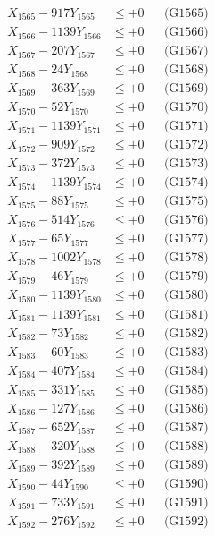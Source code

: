 \documentclass[a4paper,10pt]{article}
\begin{document}
{\begin{align}
X_{1565} - 917Y_{1565} &\leq +0 && \text{(G1565)} \\
X_{1566} - 1139Y_{1566} &\leq +0 && \text{(G1566)} \\
X_{1567} - 207Y_{1567} &\leq +0 && \text{(G1567)} \\
X_{1568} - 24Y_{1568} &\leq +0 && \text{(G1568)} \\
X_{1569} - 363Y_{1569} &\leq +0 && \text{(G1569)} \\
X_{1570} - 52Y_{1570} &\leq +0 && \text{(G1570)} \\
\allowbreak
X_{1571} - 1139Y_{1571} &\leq +0 && \text{(G1571)} \\
X_{1572} - 909Y_{1572} &\leq +0 && \text{(G1572)} \\
X_{1573} - 372Y_{1573} &\leq +0 && \text{(G1573)} \\
X_{1574} - 1139Y_{1574} &\leq +0 && \text{(G1574)} \\
X_{1575} - 88Y_{1575} &\leq +0 && \text{(G1575)} \\
X_{1576} - 514Y_{1576} &\leq +0 && \text{(G1576)} \\
X_{1577} - 65Y_{1577} &\leq +0 && \text{(G1577)} \\
X_{1578} - 1002Y_{1578} &\leq +0 && \text{(G1578)} \\
X_{1579} - 46Y_{1579} &\leq +0 && \text{(G1579)} \\
X_{1580} - 1139Y_{1580} &\leq +0 && \text{(G1580)} \\
\allowbreak
X_{1581} - 1139Y_{1581} &\leq +0 && \text{(G1581)} \\
X_{1582} - 73Y_{1582} &\leq +0 && \text{(G1582)} \\
X_{1583} - 60Y_{1583} &\leq +0 && \text{(G1583)} \\
X_{1584} - 407Y_{1584} &\leq +0 && \text{(G1584)} \\
X_{1585} - 331Y_{1585} &\leq +0 && \text{(G1585)} \\
X_{1586} - 127Y_{1586} &\leq +0 && \text{(G1586)} \\
X_{1587} - 652Y_{1587} &\leq +0 && \text{(G1587)} \\
X_{1588} - 320Y_{1588} &\leq +0 && \text{(G1588)} \\
X_{1589} - 392Y_{1589} &\leq +0 && \text{(G1589)} \\
X_{1590} - 44Y_{1590} &\leq +0 && \text{(G1590)} \\
\allowbreak
X_{1591} - 733Y_{1591} &\leq +0 && \text{(G1591)} \\
X_{1592} - 276Y_{1592} &\leq +0 && \text{(G1592)} \\

\end{align}}
\end{document}
